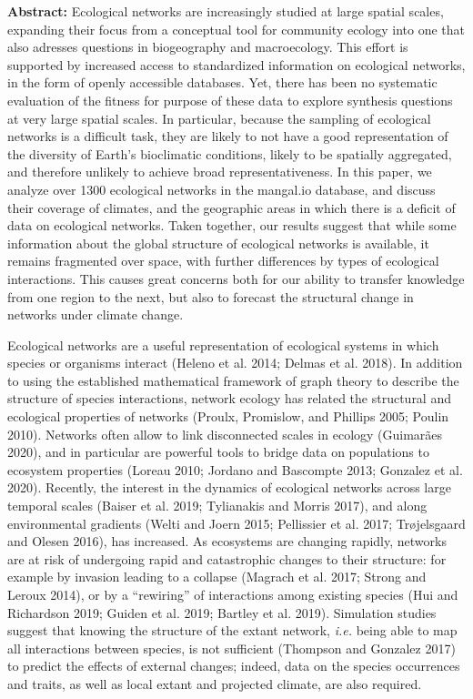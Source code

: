 \documentclass[11pt]{article}
\begin{document}
\vfill
\textbf{\sffamily Abstract: }Ecological networks are increasingly
studied at large spatial scales, expanding their focus from a conceptual
tool for community ecology into one that also adresses questions in
biogeography and macroecology. This effort is supported by increased
access to standardized information on ecological networks, in the form
of openly accessible databases. Yet, there has been no systematic
evaluation of the fitness for purpose of these data to explore synthesis
questions at very large spatial scales. In particular, because the
sampling of ecological networks is a difficult task, they are likely to
not have a good representation of the diversity of Earth's bioclimatic
conditions, likely to be spatially aggregated, and therefore unlikely to
achieve broad representativeness. In this paper, we analyze over 1300
ecological networks in the mangal.io database, and discuss their
coverage of climates, and the geographic areas in which there is a
deficit of data on ecological networks. Taken together, our results
suggest that while some information about the global structure of
ecological networks is available, it remains fragmented over space, with
further differences by types of ecological interactions. This causes
great concerns both for our ability to transfer knowledge from one
region to the next, but also to forecast the structural change in
networks under climate change.
\vfill

\clearpage
\linenumbers
\pagestyle{normal}

Ecological networks are a useful representation of ecological systems in
which species or organisms interact (Heleno et al. 2014; Delmas et al.
2018). In addition to using the established mathematical framework of
graph theory to describe the structure of species interactions, network
ecology has related the structural and ecological properties of networks
(Proulx, Promislow, and Phillips 2005; Poulin 2010). Networks often
allow to link disconnected scales in ecology (Guimarães 2020), and in
particular are powerful tools to bridge data on populations to ecosystem
properties (Loreau 2010; Jordano and Bascompte 2013; Gonzalez et al.
2020). Recently, the interest in the dynamics of ecological networks
across large temporal scales (Baiser et al. 2019; Tylianakis and Morris
2017), and along environmental gradients (Welti and Joern 2015;
Pellissier et al. 2017; Trøjelsgaard and Olesen 2016), has increased. As
ecosystems are changing rapidly, networks are at risk of undergoing
rapid and catastrophic changes to their structure: for example by
invasion leading to a collapse (Magrach et al. 2017; Strong and Leroux
2014), or by a ``rewiring'' of interactions among existing species (Hui
and Richardson 2019; Guiden et al. 2019; Bartley et al. 2019).
Simulation studies suggest that knowing the structure of the extant
network, \emph{i.e.} being able to map all interactions between species,
is not sufficient (Thompson and Gonzalez 2017) to predict the effects of
external changes; indeed, data on the species occurrences and traits, as
well as local extant and projected climate, are also required.
\end{document}
